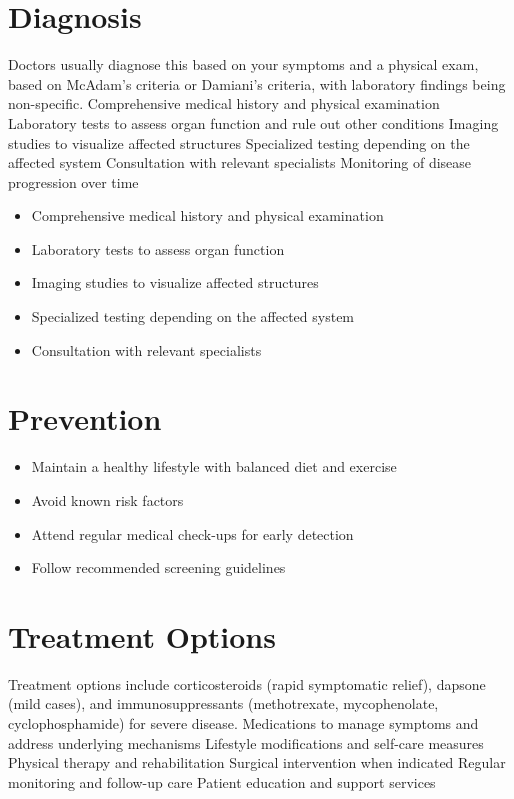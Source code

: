 \section{Diagnosis}
Doctors usually diagnose this based on your symptoms and a physical exam, based on McAdam's criteria or Damiani's criteria, with laboratory findings being non-specific. Comprehensive medical history and physical examination Laboratory tests to assess organ function and rule out other conditions Imaging studies to visualize affected structures Specialized testing depending on the affected system Consultation with relevant specialists Monitoring of disease progression over time

\begin{itemize}[noitemsep]
  \item Comprehensive medical history and physical examination
  \item Laboratory tests to assess organ function
  \item Imaging studies to visualize affected structures
  \item Specialized testing depending on the affected system
  \item Consultation with relevant specialists
\end{itemize}
\section{Prevention}
\begin{itemize}[noitemsep]
  \item Maintain a healthy lifestyle with balanced diet and exercise
  \item Avoid known risk factors
  \item Attend regular medical check-ups for early detection
  \item Follow recommended screening guidelines
\end{itemize}
\section{Treatment Options}
Treatment options include corticosteroids (rapid symptomatic relief), dapsone (mild cases), and immunosuppressants (methotrexate, mycophenolate, cyclophosphamide) for severe disease. Medications to manage symptoms and address underlying mechanisms Lifestyle modifications and self-care measures Physical therapy and rehabilitation Surgical intervention when indicated Regular monitoring and follow-up care Patient education and support services

